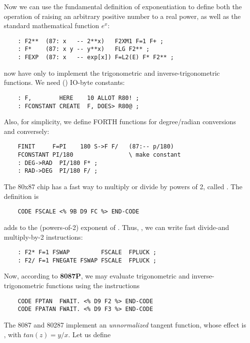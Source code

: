 Now we can use the fundamental definition of exponentiation to define both the operation of raising an arbitrary positive number to a real power, as well as the standard mathematical function $e^x$:

\begin{lstlisting}
    : F2**  (87: x   -- 2**x)   F2XM1 F=1 F+ ;
    : F*    (87: x y -- y**x)   FLG F2** ;
    : FEXP  (87: x   -- exp[x]) F=L2(E) F* F2** ;
\end{lstlisting}

 now have only to implement the trigonometric and inverse-trigonometric functions. We need () IO-byte constants:

\begin{lstlisting}
    : F,        HERE    10 ALLOT R80! ;
    : FCONSTANT CREATE  F, DOES> R80@ ;
\end{lstlisting}

Also, for simplicity, we define FORTH functions for degree/radian conversions and conversely:

\begin{lstlisting}
    FINIT     F=PI    180 S->F F/   (87:-- p/180)
    FCONSTANT PI/180                \ make constant
    : DEG->RAD  PI/180 F* ;
    : RAD->DEG  PI/180 F/ ;
\end{lstlisting}


The 80x87 chip has a fast way to multiply or divide by powers of 2, called . The  definition is

\begin{lstlisting}
    CODE FSCALE <% 9B D9 FC %> END-CODE
\end{lstlisting}

 adds  to the (powers-of-2) exponent of . Thus, \eg, we can write fast divide-and multiply-by-2 instructions:

\begin{lstlisting}
    : F2* F=1 FSWAP         FSCALE  FPLUCK ;
    : F2/ F=1 FNEGATE FSWAP FSCALE  FPLUCK ;
\end{lstlisting}

Now, according to \textbf{8087P}, we may evaluate trigonometric and inverse-trigonometric functions using the instructions

\begin{lstlisting}
    CODE FPTAN  FWAIT. <% D9 F2 %> END-CODE
    CODE FPATAN FWAIT. <% D9 F3 %> END-CODE
\end{lstlisting}

The 8087 and 80287 implement an \textit{unnormalized} tangent function, whose effect is , with $tan(z)=y/x$. Let us define

